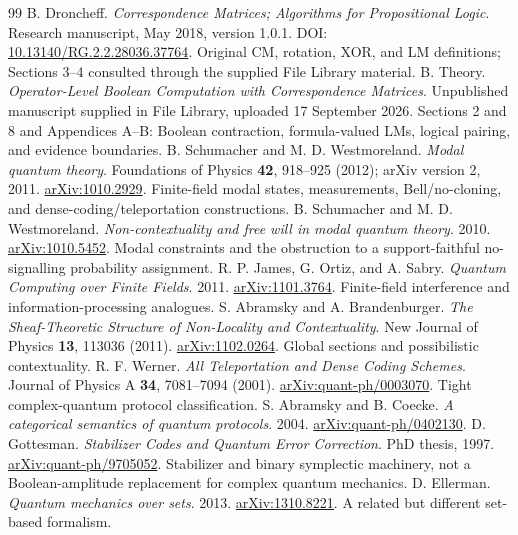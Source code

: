 \documentclass[11pt,a4paper]{article}
\theoremstyle{definition}\newtheorem{definition}[theorem]{Definition}
\begin{document}
\begin{thebibliography}{99}
 B. Droncheff. \emph{Correspondence Matrices; Algorithms for Propositional Logic}. Research manuscript, May 2018, version 1.0.1. DOI: \href{https://doi.org/10.13140/RG.2.2.28036.37764}{10.13140/RG.2.2.28036.37764}. Original CM, rotation, XOR, and LM definitions; Sections 3--4 consulted through the supplied File Library material.
 B. Theory. \emph{Operator-Level Boolean Computation with Correspondence Matrices}. Unpublished manuscript supplied in File Library, uploaded 17 September 2026. Sections 2 and 8 and Appendices A--B: Boolean contraction, formula-valued LMs, logical pairing, and evidence boundaries.
 B. Schumacher and M. D. Westmoreland. \emph{Modal quantum theory}. Foundations of Physics \textbf{42}, 918--925 (2012); arXiv version 2, 2011. \href{https://arxiv.org/abs/1010.2929}{arXiv:1010.2929}. Finite-field modal states, measurements, Bell/no-cloning, and dense-coding/teleportation constructions.
 B. Schumacher and M. D. Westmoreland. \emph{Non-contextuality and free will in modal quantum theory}. 2010. \href{https://arxiv.org/abs/1010.5452}{arXiv:1010.5452}. Modal constraints and the obstruction to a support-faithful no-signalling probability assignment.
 R. P. James, G. Ortiz, and A. Sabry. \emph{Quantum Computing over Finite Fields}. 2011. \href{https://arxiv.org/abs/1101.3764}{arXiv:1101.3764}. Finite-field interference and information-processing analogues.
 S. Abramsky and A. Brandenburger. \emph{The Sheaf-Theoretic Structure of Non-Locality and Contextuality}. New Journal of Physics \textbf{13}, 113036 (2011). \href{https://arxiv.org/abs/1102.0264}{arXiv:1102.0264}. Global sections and possibilistic contextuality.
 R. F. Werner. \emph{All Teleportation and Dense Coding Schemes}. Journal of Physics A \textbf{34}, 7081--7094 (2001). \href{https://arxiv.org/abs/quant-ph/0003070}{arXiv:quant-ph/0003070}. Tight complex-quantum protocol classification.
 S. Abramsky and B. Coecke. \emph{A categorical semantics of quantum protocols}. 2004. \href{https://arxiv.org/abs/quant-ph/0402130}{arXiv:quant-ph/0402130}.
 D. Gottesman. \emph{Stabilizer Codes and Quantum Error Correction}. PhD thesis, 1997. \href{https://arxiv.org/abs/quant-ph/9705052}{arXiv:quant-ph/9705052}. Stabilizer and binary symplectic machinery, not a Boolean-amplitude replacement for complex quantum mechanics.
 D. Ellerman. \emph{Quantum mechanics over sets}. 2013. \href{https://arxiv.org/abs/1310.8221}{arXiv:1310.8221}. A related but different set-based formalism.

\end{thebibliography}
\end{document}

